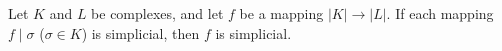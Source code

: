 Let $K$ and $L$ be complexes, and let $f$ be a mapping $|K| \rightarrow |L|$. If each mapping $f \mid \sigma$ ($\sigma \in K$) is simplicial, then $f$ is simplicial.
